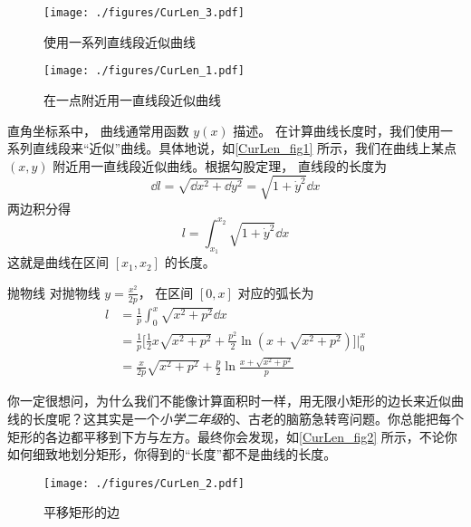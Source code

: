 

\begin{figure}[ht]
\centering
\texttt{[image: ./figures/CurLen\_3.pdf]}
\caption{使用一系列直线段近似曲线} \label{CurLen_fig3}
\end{figure}

\begin{figure}[ht]
\centering
\texttt{[image: ./figures/CurLen\_1.pdf]}
\caption{在一点附近用一直线段近似曲线} \label{CurLen_fig1}
\end{figure}

直角坐标系中， 曲线通常用函数 $y(x)$ 描述。 在计算曲线长度时，我们使用一系列直线段来“近似”曲线。具体地说，如\autoref{CurLen_fig1} 所示，我们在曲线上某点 $(x, y)$ 附近用一直线段近似曲线。根据勾股定理， 直线段的长度为
\begin{equation}
\dd{l} = \sqrt{\dd{x}^2 + \dd{y}^2} = \sqrt{1 + \dot y^2} \dd{x}
\end{equation}
两边积分得
\begin{equation}\label{CurLen_eq1}
l = \int_{x_1}^{x_2} \sqrt{1 + \dot y^2} \dd{x}
\end{equation}
这就是曲线在区间 $[x_1, x_2]$ 的长度。

\begin{example}{抛物线}
对抛物线 $y=\frac{x^2}{2p}$， 在区间 $[0,x]$ 对应的弧长为
\begin{equation}
\begin{aligned}
l& = \frac{1}{p}\int_{0}^{x}\sqrt{x^2+p^2}\dd{x}\\
&=\frac{1}{p}\bigg[\frac{1}{2}x\sqrt{x^2+p^2}+\frac{p^2}{2}\ln(x+\sqrt{x^2+p^2})\bigg]\Bigg\lvert_{0}^{x}\\
&=\frac{x}{2p}\sqrt{x^2+p^2}+\frac{p}{2}\ln\frac{x+\sqrt{x^2+p^2}}{p}
\end{aligned}
\end{equation}
\end{example}

你一定很想问，为什么我们不能像计算面积时一样，用无限小矩形的边长来近似曲线的长度呢？这其实是一个\textsl{小学二年级}的、古老的脑筋急转弯问题。你总能把每个矩形的各边都平移到下方与左方。最终你会发现，如\autoref{CurLen_fig2} 所示，不论你如何细致地划分矩形，你得到的“长度”都不是曲线的长度。
\begin{figure}[ht]
\centering
\texttt{[image: ./figures/CurLen\_2.pdf]}
\caption{平移矩形的边} \label{CurLen_fig2}
\end{figure}

